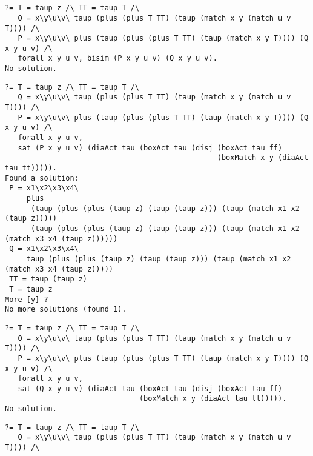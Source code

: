 \documentclass{article}
\renewcommand{\vDash}{\models}
\newcommand{\ttt}{\mathtt{t\hspace*{-.25em}t}}
\newcommand{\fff}{\mathtt{f\hspace*{-.25em}f}}
\newcommand{\boxm}[1]{\mathopen{\big[ #1 \big]}} %
\newcommand{\diam}[1]{\mathopen{\big\langle #1 \big\rangle}}
\begin{document}
{{{\section{}
{\small%
\begin{verbatim}
?= T = taup z /\ TT = taup T /\
   Q = x\y\u\v\ taup (plus (plus T TT) (taup (match x y (match u v T)))) /\
   P = x\y\u\v\ plus (taup (plus (plus T TT) (taup (match x y T)))) (Q x y u v) /\
   forall x y u v, bisim (P x y u v) (Q x y u v).
No solution.
\end{verbatim}
%
\fbox{$
P \vDash
\mathopen{\diam{\tau}\boxm{\tau}}\big(\boxm{\tau}\fff \vee \boxm{x=y}\diam{\tau}\ttt\big)
$}
{\small%
\begin{verbatim}
?= T = taup z /\ TT = taup T /\
   Q = x\y\u\v\ taup (plus (plus T TT) (taup (match x y (match u v T)))) /\
   P = x\y\u\v\ plus (taup (plus (plus T TT) (taup (match x y T)))) (Q x y u v) /\
   forall x y u v,
   sat (P x y u v) (diaAct tau (boxAct tau (disj (boxAct tau ff)
                                                 (boxMatch x y (diaAct tau tt))))).
Found a solution:
 P = x1\x2\x3\x4\
     plus
      (taup (plus (plus (taup z) (taup (taup z))) (taup (match x1 x2 (taup z)))))
      (taup (plus (plus (taup z) (taup (taup z))) (taup (match x1 x2 (match x3 x4 (taup z))))))
 Q = x1\x2\x3\x4\
     taup (plus (plus (taup z) (taup (taup z))) (taup (match x1 x2 (match x3 x4 (taup z)))))
 TT = taup (taup z)
 T = taup z
More [y] ? 
No more solutions (found 1).
\end{verbatim}}
%
\fbox{$
Q \not\vDash
\mathopen{\diam{\tau}\boxm{\tau}}\big(\boxm{\tau}\fff \vee \boxm{x=y}\diam{\tau}\ttt\big)
$}
{\small%
\begin{verbatim}
?= T = taup z /\ TT = taup T /\ 
   Q = x\y\u\v\ taup (plus (plus T TT) (taup (match x y (match u v T)))) /\ 
   P = x\y\u\v\ plus (taup (plus (plus T TT) (taup (match x y T)))) (Q x y u v) /\ 
   forall x y u v,
   sat (Q x y u v) (diaAct tau (boxAct tau (disj (boxAct tau ff)
                               (boxMatch x y (diaAct tau tt))))).
No solution.
\end{verbatim}
%
\fbox{$
Q \vDash
\mathopen{\boxm{\tau}\diam{\tau}}\left(\boxm{\tau}\diam{w=z}\ttt \wedge \boxm{x=y}\boxm{w=z}\diam{\tau}\ttt\right)
$}
{\small%
\begin{verbatim}
?= T = taup z /\ TT = taup T /\ 
   Q = x\y\u\v\ taup (plus (plus T TT) (taup (match x y (match u v T)))) /\ 

\end{verbatim}}}}}}}
\end{document}
